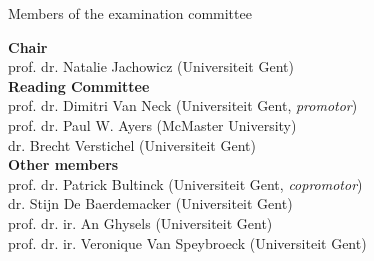 \cleardoublepage
\thispagestyle{empty}

\vspace*{\fill}
\Large
Members of the examination committee

\vspace{0.5cm}
\normalsize
\textbf{Chair} \\

prof. dr. Natalie Jachowicz (Universiteit Gent) \\

\textbf{Reading Committee} \\  

prof. dr. Dimitri Van Neck (Universiteit Gent, \textit{promotor}) \\
prof. dr. Paul W. Ayers (McMaster University) \\
dr. Brecht Verstichel (Universiteit Gent) \\

\textbf{Other members}  \\

prof. dr. Patrick Bultinck (Universiteit Gent, \textit{copromotor}) \\
dr. Stijn De Baerdemacker (Universiteit Gent) \\
prof. dr. ir. An Ghysels (Universiteit Gent) \\
prof. dr. ir. Veronique Van Speybroeck (Universiteit Gent) \\

\vspace*{\fill}
